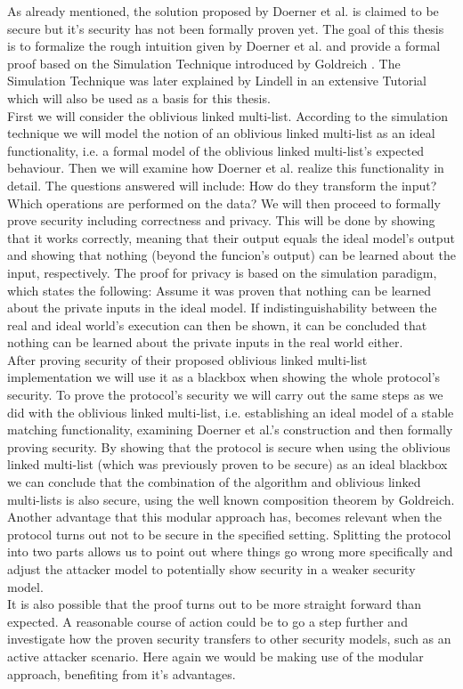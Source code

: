 As already mentioned, the solution proposed by Doerner et al. is claimed to be secure but it's security has not been formally proven yet. The goal of this thesis is to formalize the rough intuition given by Doerner et al.  and provide a formal proof based on the Simulation Technique introduced by Goldreich . The Simulation Technique was later explained by Lindell in an extensive Tutorial  which will also be used as a basis for this thesis.\\
First we will consider the oblivious linked multi-list. According to the simulation technique we will model the notion of an oblivious linked multi-list as an ideal functionality, i.e. a formal model of the oblivious linked multi-list's expected behaviour. Then we will examine how Doerner et al. realize this functionality in detail. The questions answered will include: How do they transform the input? Which operations are performed on the data? We will then proceed to formally prove security including correctness and privacy. This will be done by showing that it works correctly, meaning that their output equals the ideal model's output and showing that nothing (beyond the funcion's output) can be learned about the input, respectively. The proof for privacy is based on the simulation paradigm, which states the following: Assume it was proven that nothing can be learned about the private inputs in the ideal model. If indistinguishability between the real and ideal world's execution can then be shown, it can be concluded that nothing can be learned about the private inputs in the real world either.\\
After proving security of their proposed oblivious linked multi-list implementation we will use it as a blackbox when showing the whole protocol's security. To prove the protocol's security we will carry out the same steps as we did with the oblivious linked multi-list, i.e. establishing an ideal model of a stable matching functionality, examining Doerner et al.'s construction and then formally proving security. By showing that the protocol is secure when using the oblivious linked multi-list (which was previously proven to be secure) as an ideal blackbox we can conclude that the combination of the algorithm and oblivious linked multi-lists is also secure, using the well known composition theorem by Goldreich.\\
Another advantage that this modular approach has, becomes relevant when the protocol turns out not to be secure in the specified setting. Splitting the protocol into two parts allows us to point out where things go wrong more specifically and adjust the attacker model to potentially show security in a weaker security model.\\
It is also possible that the proof turns out to be more straight forward than expected. A reasonable course of action could be to go a step further and investigate how the proven security transfers to other security models, such as an active attacker scenario. Here again we would be making use of the modular approach, benefiting from it's advantages.\\